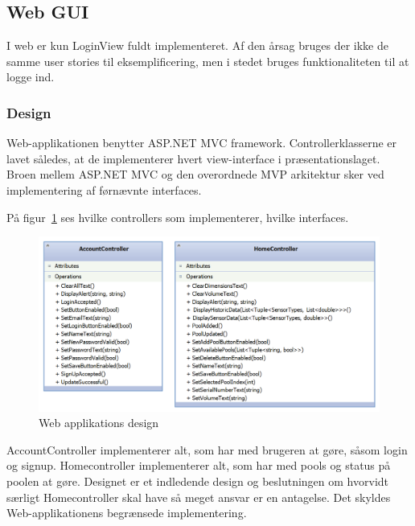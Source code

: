 \subsection{Web GUI}
I web er kun LoginView fuldt implementeret. Af den årsag bruges der ikke de samme user stories til eksemplificering, men i stedet bruges funktionaliteten til at logge ind.

\subsubsection{Design}
Web-applikationen benytter ASP.NET MVC framework. Controllerklasserne er lavet således, at de implementerer hvert view-interface i præsentationslaget. Broen mellem ASP.NET MVC og den overordnede MVP arkitektur sker ved implementering af førnævnte interfaces.

På figur~\ref{fig:web_class} ses hvilke controllers som implementerer, hvilke interfaces.

\begin{figure}
	\centering
	\includegraphics[width=0.9\linewidth]{figs/design/application_web}
	\caption{Web applikations design}
	\label{fig:web_class}
\end{figure}

AccountController implementerer alt, som har med brugeren at gøre, såsom login og signup. Homecontroller implementerer alt, som har med pools og status på poolen at gøre. Designet er et indledende design og beslutningen om hvorvidt særligt Homecontroller skal have så meget ansvar er en antagelse. Det skyldes Web-applikationens begrænsede implementering. 

